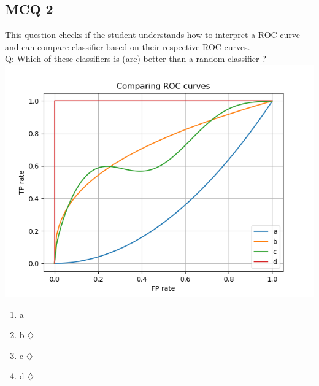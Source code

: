 \documentclass[a4paper, 10pt]{article}
\begin{document}
\subsection{MCQ 2}
This question checks if the student understands how to interpret a ROC curve and can compare
classifier based on their respective ROC curves.
\\
Q: Which of these classifiers is (are) better than a random classifier ? 
\\
\includegraphics{ex4}
\\
\begin{enumerate}
    \item a
    \item b $\diamondsuit$
    \item c $\diamondsuit$
    \item d $\diamondsuit$
\end{enumerate}
\end{document}
